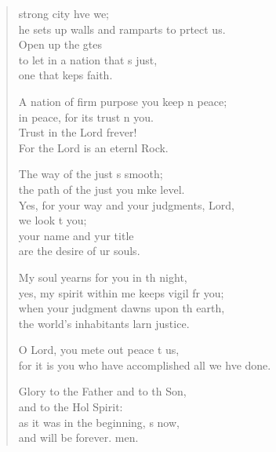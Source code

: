 \begin{verse}
  \begin{patverse}
 strong city hve we;\Med\\
he sets up walls and ramparts to prtect us.\\
Open up the gtes\Flex\\
to let in a nation that \pointup{\i}s just,\Med\\
one that keps faith.

A nation of firm purpose you keep \pointup{\i}n peace;\Med\\
in peace, for its trust \pointup{\i}n you.\\
Trust in the Lord frever!\Med\\
For the Lord is an eternl Rock.

The way of the just \pointup{\i}s smooth;\Med\\
the path of the just you mke level.\\
Yes, for your way and your judgments,  Lord,\Med\\
we look t you;\\
your name and yur title\Med\\
are the desire of ur souls.

My soul yearns for you in th night,\Med\\
yes, my spirit within me keeps vigil fr you;\\
when your judgment dawns upon th earth,\Med\\
the world’s inhabitants larn justice.

O Lord, you mete out peace t us,\Med\\
for it is you who have accomplished all we hve done.

Glory to the Father and to th Son,\Med\\
and to the Hol Spirit:\\
as it was in the beginning, \pointup{\i}s now,\Med\\
and will be forever. men.
  \end{patverse}
\end{verse}
